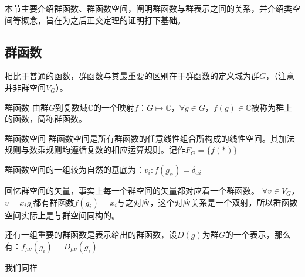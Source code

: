 
\begin{issues}
\issueDraft
\issueTODO
\end{issues}

本节主要介绍群函数、群函数空间，阐明群函数与群表示之间的关系，并介绍类空间等概念，旨在为之后正交定理的证明打下基础。

\subsection{群函数}

相比于普通的函数，群函数与其最重要的区别在于群函数的定义域为群$G$，（注意并非群空间$V_G$）。
\begin{definition}{群函数}
由群$G$到复数域$\mathbb{C}$的一个映射$f$：$G\longmapsto \mathbb{C}$，$\forall g\in G$，$f(g)\in \mathbb{C}$被称为群上的函数，简称群函数。
\end{definition}

\begin{definition}{群函数空间}
群函数空间是所有群函数的任意线性组合所构成的线性空间。其加法规则与数乘规则均遵循复数的相应运算规则。记作$F_G=\{f(*)\}$
\end{definition}

群函数空间的一组较为自然的基底为：$v_i:f(g_\alpha)=\delta_{\alpha i}$

回忆群空间的矢量，事实上每一个群空间的矢量都对应着一个群函数。
$\forall v\in V_G$，$v=x_ig_i$都有群函数$f(g_i)=x_i$与之对应，这个对应关系是一个双射，所以群函数空间实际上是与群空间同构的。

还有一组重要的群函数是表示给出的群函数，设$D(g)$为群$G$的一个表示，那么有：$f_{\mu\nu}(g_i)=D_{\mu\nu}(g_i)$

我们同样